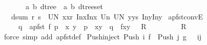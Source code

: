 \begin{isabellebody}
\ \ \ \ \ \ {\isacharequal}{\isachargreater}\ {\isacharparenleft}{\isacharparenleft}{\isacharprime}a{\isacharcomma}\ {\isacharprime}b{\isacharparenright}\ dtree\ {\isacharasterisk}\ {\isacharparenleft}{\isacharprime}a{\isacharcomma}\ {\isacharprime}b{\isacharparenright}\ dtree{\isacharparenright}set{\isachardoublequoteclose}\isanewline
\ \ \ {\isachardoublequoteopen}dsum\ r\ s\ {\isacharequal}{\isacharequal}\ {\isacharparenleft}UN\ {\isacharparenleft}x{\isacharcomma}x{\isacharprime}{\isacharparenright}{\isacharcolon}r{\isachardot}\ {\isacharbraceleft}{\isacharparenleft}In{}{\isacharparenleft}x{\isacharparenright}{\isacharcomma}In{}{\isacharparenleft}x{\isacharprime}{\isacharparenright}{\isacharparenright}{\isacharbraceright}{\isacharparenright}\ Un\ {\isacharparenleft}UN\ {\isacharparenleft}y{\isacharcomma}y{\isacharprime}{\isacharparenright}{\isacharcolon}s{\isachardot}\ {\isacharbraceleft}{\isacharparenleft}In{}{\isacharparenleft}y{\isacharparenright}{\isacharcomma}In{}{\isacharparenleft}y{\isacharprime}{\isacharparenright}{\isacharparenright}{\isacharbraceright}{\isacharparenright}{\isachardoublequoteclose}\isanewline
\isanewline
\isanewline
{}\isamarkupfalse%
\ apfst{\isacharunderscore}convE{\isacharcolon}\ \isanewline
\ \ \ \ {\isachardoublequoteopen}{\isacharbrackleft}{\isacharbar}\ q\ {\isacharequal}\ apfst\ f\ p{\isacharsemicolon}\ \ {\isacharbang}{\isacharbang}x\ y{\isachardot}\ {\isacharbrackleft}{\isacharbar}\ p\ {\isacharequal}\ {\isacharparenleft}x{\isacharcomma}y{\isacharparenright}{\isacharsemicolon}\ \ q\ {\isacharequal}\ {\isacharparenleft}f{\isacharparenleft}x{\isacharparenright}{\isacharcomma}y{\isacharparenright}\ {\isacharbar}{\isacharbrackright}\ {\isacharequal}{\isacharequal}{\isachargreater}\ R\ \ \isanewline
\ \ \ \ \ {\isacharbar}{\isacharbrackright}\ {\isacharequal}{\isacharequal}{\isachargreater}\ R{\isachardoublequoteclose}\isanewline
%
\isadelimproof
%
\endisadelimproof
%
\isatagproof
{}\isamarkupfalse%
\ {\isacharparenleft}force\ simp\ add{\isacharcolon}\ apfst{\isacharunderscore}def{\isacharparenright}%
\endisatagproof
{\isafoldproof}%
%
\isadelimproof
\isanewline
%
\endisadelimproof
\isanewline
\isanewline
\isanewline
{}\isamarkupfalse%
\ Push{\isacharunderscore}inject{}{\isacharcolon}\ {\isachardoublequoteopen}Push\ i\ f\ {\isacharequal}\ Push\ j\ g\ \ {\isacharequal}{\isacharequal}{\isachargreater}\ i{\isacharequal}j{\isachardoublequoteclose}\isanewline
%
\isadelimproof
%
\endisadelimproof
%
\isatagproof

\end{isabellebody}
